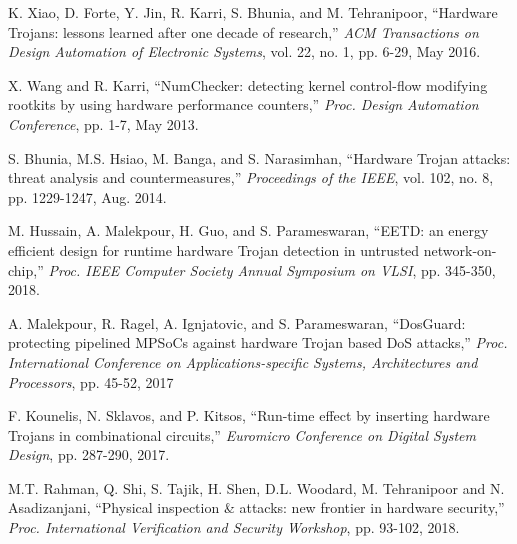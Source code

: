 \documentclass[10pt,journal, compsoc]{IEEEtran}
\begin{document}
\begin{thebibliography}{99}%

K. Xiao, D. Forte, Y. Jin, R. Karri, S. Bhunia, and M. Tehranipoor, ``Hardware Trojans: lessons learned after one decade of research,'' \textit{ACM Transactions on Design Automation of Electronic Systems}, vol. 22, no. 1, pp. 6-29, May 2016.


X. Wang and R. Karri, ``NumChecker: detecting kernel control-flow modifying rootkits by using hardware performance counters,'' \textit{Proc. Design Automation Conference}, pp. 1-7, May 2013.


S. Bhunia, M.S. Hsiao, M. Banga, and S. Narasimhan, ``Hardware Trojan attacks: threat analysis and countermeasures,'' \textit{Proceedings of the IEEE}, vol. 102, no. 8, pp. 1229-1247, Aug. 2014.

M. Hussain, A. Malekpour, H. Guo, and S. Parameswaran, ``EETD: an energy efficient design for runtime hardware Trojan detection in untrusted network-on-chip,'' \textit{Proc. IEEE Computer Society Annual Symposium on VLSI}, pp. 345-350, 2018.


A. Malekpour, R. Ragel, A. Ignjatovic, and S. Parameswaran, ``DosGuard: protecting pipelined MPSoCs against hardware Trojan based DoS attacks,'' \textit{Proc. International Conference on Applications-specific Systems, Architectures and Processors}, pp. 45-52, 2017

F. Kounelis, N. Sklavos, and P. Kitsos, ``Run-time effect by inserting hardware Trojans in combinational circuits,'' \textit{Euromicro Conference on Digital System Design}, pp. 287-290, 2017.




M.T. Rahman, Q. Shi, S. Tajik, H. Shen, D.L. Woodard, M. Tehranipoor and N. Asadizanjani, ``Physical inspection \& attacks: new frontier in hardware security,'' \textit{Proc. International Verification and Security Workshop}, pp. 93-102, 2018.



\end{thebibliography}
\end{document}
